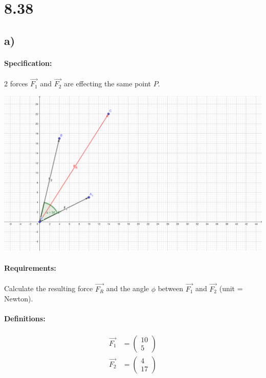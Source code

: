 \section{8.38}
\subsection{a)}

\paragraph{Specification:}
2 forces $\vec{F_1}$ and $\vec{F_2}$ are effecting the same point $P$. 

\includegraphics[width=\linewidth]{images/8-38.png}

\paragraph{Requirements:}
Calculate the resulting force $\vec{F_R}$ and the angle $\phi$ between $\vec{F_1}$ and $\vec{F_2}$ 
(unit = Newton).

\def\vFOne{\begin{pmatrix}
       10 \\ 
       5
    \end{pmatrix}}

\def\vFTwo{\begin{pmatrix}
       4 \\ 
       17
    \end{pmatrix}}

\def\vFR{\begin{pmatrix}
       14 \\ 
       22
    \end{pmatrix}}

\paragraph{Definitions:}
\begin{align}
    \vec{F_1} &= \vFOne \\
    \vec{F_2} &= \vFTwo
\end{align}


